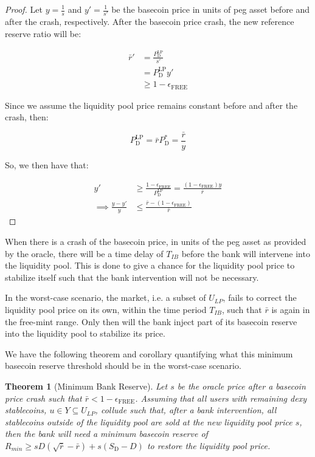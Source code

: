 \documentclass{ifcolog}
\newcommand{\Pdt}{P_{\mathrm{D}}^{*}}
\newcommand{\Plp}{P_{\mathrm{D}}^{\mathrm{LP}}}
\newcommand{\Sd}{S_{\mathrm{D}}}
\newcommand{\rr}{\bar{r}}
\newcommand{\epsilonfree}{\epsilon_{\textrm{FREE}}}
\newtheorem{theorem}{Theorem}
\begin{document}
\begin{proof}
  Let $y = \frac{1}{s}$ and $y' = \frac{1}{s'}$ be the basecoin price in units of peg asset before 
  and after the crash, respectively. After the basecoin price crash, the new reference 
  reserve ratio will be:
  
  \begin{align}
    \rr' &= \frac{\Plp}{s'} \\ 
         &= \Plp y' \\
         &\ge 1 - \epsilonfree
  \end{align}

  Since we assume the liquidity pool price remains constant before and after the crash, then:
  
  \begin{equation}
    \Plp = \rr \Pdt = \frac{\rr}{y}
  \end{equation}

  So, we then have that:
  
  \begin{align}
    y' &\ge \frac{1-\epsilonfree}{\Plp} = \frac{(1-\epsilonfree)y}{\rr} \\
       \implies \frac{y - y'}{y} &\le \frac{\rr - (1-\epsilonfree)}{\rr}
  \end{align}
\end{proof}

When there is a crash of the basecoin price, in units of the peg asset as provided by the oracle, 
there will be a time delay of $T_{IB}$ before the bank will intervene into the liquidity pool.
This is done to give a chance for the liquidity pool price to stabilize itself such that the bank intervention
will not be necessary. 

In the worst-case scenario, the market, i.e. a subset of $U_{LP}$, fails to correct the liquidity pool price on its own, 
within the time period $T_{IB}$, such that $\rr$ is again in the free-mint range. Only then will the bank inject 
part of its basecoin reserve into the liquidity pool to stabilize its price. 

We have the following theorem and corollary quantifying what this minimum basecoin reserve threshold
should be in the worst-case scenario.

\begin{theorem}[Minimum Bank Reserve]
  \label{theorem:minimum-bank-reserve}
  Let $s$ be the oracle price after a basecoin price crash such that $\rr < 1 - \epsilonfree$. 
  Assuming that all users with remaining dexy stablecoins, $u \in Y \subseteq U_{LP}$, collude such that, after a bank intervention, all stablecoins 
  outside of the liquidity pool are sold at the new liquidity pool price $s$, then the bank will need
  a minimum basecoin reserve of $R_{min} \ge sD(\sqrt{\rr} - \rr) + s(\Sd - D)$ to restore the liquidity pool price.
\end{theorem}
\end{document}
